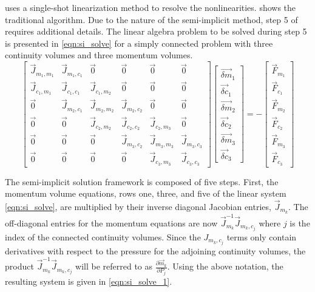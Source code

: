 \cobra uses a single-shot linearization method to resolve the nonlinearities.
 shows the traditional algorithm.
Due to the nature of the semi-implicit method, step 5 of  requires additional details.
The linear algebra problem to be solved during step 5 is presented in \eqref{eqn:si_solve} for a simply connected problem with three continuity volumes and three momentum volumes.
 \begin{equation}
 \label{eqn:si_solve}
 \begin{bmatrix} 
 \vec{J}_{m_1,m_1} & \vec{J}_{m_1,c_1} & \vec{0} & \vec{0} & \vec{0} & \vec{0}\\
 \vec{J}_{c_1,m_1} & \vec{J}_{c_1,c_1} & \vec{J}_{c_1,m_2} & \vec{0} & \vec{0} & \vec{0} \\
 \vec{0} & \vec{J}_{m_2,c_1} & \vec{J}_{m_2,m_2} & \vec{J}_{m_2,c_2} & \vec{0} & \vec{0} \\
 \vec{0} & \vec{0} & \vec{J}_{c_2,m_2} & \vec{J}_{c_2,c_2} & \vec{J}_{c_2,m_3} & \vec{0} \\
 \vec{0} & \vec{0} & \vec{0} & \vec{J}_{m_3,c_2} & \vec{J}_{m_3,m_3} & \vec{J}_{m_3,c_3} \\ 
 \vec{0} & \vec{0} & \vec{0} & \vec{0} & \vec{J}_{c_3,m_3} & \vec{J}_{c_3,c_3}  
 \end{bmatrix} \begin{bmatrix}
 \vec{\delta m}_{1} \\ \vec{\delta c}_{1} \\
 \vec{\delta m}_{2} \\ \vec{\delta c}_{2} \\
 \vec{\delta m}_{3} \\ \vec{\delta c}_{3}
\end{bmatrix}  = -\begin{bmatrix}
 \vec{F}_{m_1} \\ \vec{F}_{c_1} \\
 \vec{F}_{m_2} \\ \vec{F}_{c_2} \\
 \vec{F}_{m_3} \\ \vec{F}_{c_3} \end{bmatrix}
 \end{equation}
 
 The semi-implicit solution framework is composed of five steps.
 First, the momentum volume equations, rows one, three, and five of the linear system \eqref{eqn:si_solve}, are multiplied by their inverse diagonal Jacobian entries, $\vec{J}_{m_k}$.
 The off-diagonal entries for the momentum equations are now $\vec{J}^{-1}_{m_k}\vec{J}_{m_k,c_j}$ where $j$ is the index of the connected continuity volumes.
 Since the $J_{m_k,c_j}$ terms only contain derivatives with respect to the pressure for the adjoining continuity volumes, the product $\vec{J}^{-1}_{m_k}\vec{J}_{m_k,c_j}$ will be referred to as $\frac{\partial \vec{m}_k}{\partial P_j}$.
 Using the above notation, the resulting system is given in \eqref{eqn:si_solve_1}.
 
